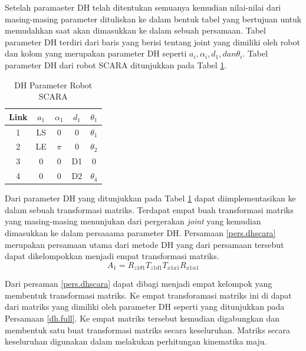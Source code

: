 Setelah paramaeter DH telah ditentukan semuanya kemudian nilai-nilai dari masing-masing parameter dituliskan ke dalam bentuk tabel yang bertujuan untuk memudahkan saat akan dimasukkan ke dalam sebuah persamaan. Tabel parameter DH terdiri dari baris yang berisi tentang joint yang dimiliki oleh robot dan kolom yang merupakan parameter DH seperti $a_{i},\alpha_{i}, d_{1}, dan \theta_{i}$. Tabel parameter DH dari robot SCARA ditunjukkan pada Tabel \ref{dh.scara}. 

\begin{table}[H]
	\centering
	\caption{DH Parameter Robot SCARA}
	\label{dh.scara}

		\begin{tabular}{|c|c|c|c|c|}
			\hline
			\rowcolor[HTML]{9B9B9B} 
			Link & $a_{1}$ & $\alpha_{1}$ & $d_{1}$ & $\theta_{1}$ \\ \hline
			1    & LS & 0      & 0     & $\theta_{1}$     \\ \hline
			2    & LE & $\pi$    & 0     & $\theta_{2}	$     \\ \hline
			3    & 0     & 0      & D1 & 0          \\ \hline
			4    & 0     & 0      & D2 & $\theta_{4}$ \\ \hline
		\end{tabular}
	
\end{table}

Dari parameter DH yang ditunjukkan pada Tabel \ref{dh.scara} dapat diimplementasikan ke dalam sebuah transformasi matriks. Terdapat empat buah transformasi matriks yang masing-masing menunjukan dari pergerakan \textit{joint} yang kemudian dimasukkan ke dalam persaaama parameter DH. Persamaan \ref{pers.dhscara} merupakan persamaan utama dari metode DH yang dari persamaan tersebut dapat dikelompokkan menjadi empat transformasi matriks.
\begin{equation}
A_{1} = R_{z1\theta1}T_{z1d1}T_{x1a1}R_{x1\alpha1}
\label{pers.dhscara}
\end{equation}

Dari persaman \ref{pers.dhscara} dapat dibagi menjadi empat kelompok yang membentuk transformasi matriks. Ke empat transforamasi matriks ini di dapat dari matriks yang dimiliki oleh parameter DH seperti yang ditunjukkan pada Persamaan \ref{dh.full}. Ke empat matriks tersebut kemudian digabungkan dan membentuk satu buat transformasi matriks secara keseluruhan. Matriks secara keseluruhan digunakan dalam melakukan perhitungan kinematika maju.

